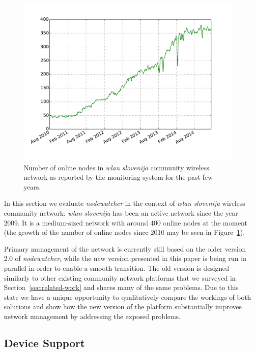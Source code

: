 \documentclass[5p,sort&compress]{elsarticle}
\newcommand{\nodewatcher}{\textit{nodewatcher}}
\newcommand{\wlanslovenija}{\textit{wlan slovenija}}
\begin{document}
\begin{figure}
  \centering
  \includegraphics[scale=0.45]{figures/wlansi-nodes-up.pdf}
  \caption{Number of online nodes in \wlanslovenija{} community wireless network as reported by the monitoring system for the past few years.}
  \label{fig:wlansi-nodes-up}
\end{figure}

In this section we evaluate \nodewatcher{} in the context of \wlanslovenija{} wireless community network.
\wlanslovenija{} has been an active network since the year 2009.
It is a medium-sized network with around $400$ online nodes at the moment (the growth of the number of online nodes since 2010 may be seen in Figure~\ref{fig:wlansi-nodes-up}).

Primary management of the network is currently still based on the older version 2.0 of \nodewatcher{}, while the new version presented in this paper is being run in parallel in order to enable a smooth transition.
The old version is designed similarly to other existing community network platforms that we surveyed in Section~\ref{sec:related-work} and shares many of the same problems.
Due to this state we have a unique opportunity to qualitatively compare the workings of both solutions and show how the new version of the platform substantially improves network management by addressing the exposed problems.

\subsection{Device Support}
\end{document}
